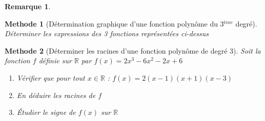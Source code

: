 \documentclass[11pt,a4paper]{article}
\def\R{{\mathbb R}}
\theoremstyle{break}
\newtheorem{Rem}{Remarque}
\newtheorem{Meth}{Methode}
\begin{document}
\begin{Rem}
\begin{multicols}{3}
\begin{itemize}
\begin{center}
\begin{pspicture*}
			
			\end{pspicture*}
		\end{center}
	\end{itemize}
		\end{multicols}
\end{Rem}		
\begin{Meth}[Détermination graphique d'une fonction polynôme du 3$^{ème}$ degré]
	Déterminer les expressions des 3 fonctions représentées ci-dessus
\end{Meth}
	\begin{Meth}[Déterminer les racines d'une fonction polynôme de degré 3]
		Soit la fonction $f$ définie sur $\R$ par $f(x)=2x^3-6x^2-2x+6$
		\begin{enumerate}
			\item Vérifier que pour tout $x\in\R$ : $f(x)=2(x-1)(x+1)(x-3)$
			\item En déduire les racines de $f$
			\item Étudier le signe de $f(x)$ sur $\R$
		\end{enumerate}
	\end{Meth}
\end{document}
